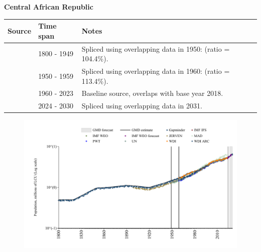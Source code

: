 \documentclass[12pt,a4paper,landscape]{article}
\begin{document}
\begin{adjustbox}{max totalsize={\paperwidth}{\paperheight},center}
\begin{minipage}[t][\textheight][t]{\textwidth}
\vspace*{0.5cm}
{}
\begin{center}
{\Large\bfseries Central African Republic}
\end{center}
\vspace{0.5cm}
\begin{table}[H]
\centering
\small
\begin{tabular}{|l|l|l|}
\hline
\textbf{Source} & \textbf{Time span} & \textbf{Notes} \\
\hline
\rowcolor{white}\cite{Gapminder}& 1800 - 1949 &Spliced using overlapping data in 1950: (ratio = 104.4\%).\\
\rowcolor{lightgray}\cite{IMF_IFS}& 1950 - 1959 &Spliced using overlapping data in 1960: (ratio = 113.4\%).\\
\rowcolor{white}\cite{WDI}& 1960 - 2023 &Baseline source, overlaps with base year 2018.\\
\rowcolor{lightgray}\cite{Gapminder}& 2024 - 2030 &Spliced using overlapping data in 2031.\\
\hline
\end{tabular}
\end{table}
\begin{figure}[H]
\centering
\includegraphics[width=\textwidth,height=0.6\textheight,keepaspectratio]{graphs/CAF_pop.pdf}
\end{figure}
\end{minipage}
\end{adjustbox}
\end{document}
